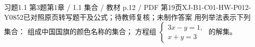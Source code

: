 \par\noindent\begin{minipage}{\linewidth}
\begin{bankitem}{习题1.1 第3题}{第1章 / 1.1 集合 / 教材 p.12 / PDF 第19页}{XJ-B1-C01-HW-P012-Y0852}{已对照原页转写题干及公式；待教师复核；未制作答案}
用列举法表示下列集合：
组成中国国旗的颜色名称的集合；
方程组 $\begin{cases}3x-y=1,\\x+y=3\end{cases}$ 的解集。
\end{bankitem}
\end{minipage}\par\medskip
